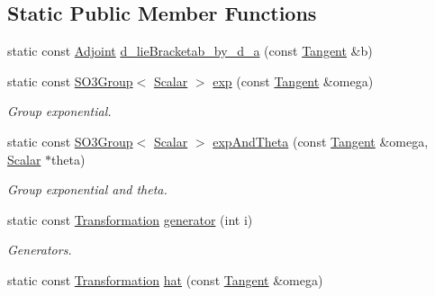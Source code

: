 \subsection*{Static Public Member Functions}
\begin{DoxyCompactItemize}
\item 
static const \hyperlink{class_sophus_1_1_s_o3_group_base_a51c46f75563c21fbd223b4a444923306}{Adjoint} \hyperlink{class_sophus_1_1_s_o3_group_base_a9b89eaf13ca40eb929ce3bc02b71f592}{d\+\_\+lie\+Bracketab\+\_\+by\+\_\+d\+\_\+a} (const \hyperlink{class_sophus_1_1_s_o3_group_base_a11150229b6a471ae96cde974ece5ec7c}{Tangent} \&b)
\item 
static const \hyperlink{class_sophus_1_1_s_o3_group}{S\+O3\+Group}$<$ \hyperlink{class_sophus_1_1_s_o3_group_base_a31bf31815c195b7150da8a8e8c6f0189}{Scalar} $>$ \hyperlink{class_sophus_1_1_s_o3_group_base_a7d224bfb20704608dc41e5a5f16ba9a4}{exp} (const \hyperlink{class_sophus_1_1_s_o3_group_base_a11150229b6a471ae96cde974ece5ec7c}{Tangent} \&omega)
\begin{DoxyCompactList}\small\item\em Group exponential. \end{DoxyCompactList}\item 
static const \hyperlink{class_sophus_1_1_s_o3_group}{S\+O3\+Group}$<$ \hyperlink{class_sophus_1_1_s_o3_group_base_a31bf31815c195b7150da8a8e8c6f0189}{Scalar} $>$ \hyperlink{class_sophus_1_1_s_o3_group_base_a79e8ae77c3461891a8eb2e2b4103c87c}{exp\+And\+Theta} (const \hyperlink{class_sophus_1_1_s_o3_group_base_a11150229b6a471ae96cde974ece5ec7c}{Tangent} \&omega, \hyperlink{class_sophus_1_1_s_o3_group_base_a31bf31815c195b7150da8a8e8c6f0189}{Scalar} $\ast$theta)
\begin{DoxyCompactList}\small\item\em Group exponential and theta. \end{DoxyCompactList}\item 
static const \hyperlink{class_sophus_1_1_s_o3_group_base_aa20fc57bf1b355a6616f5c4b785f1fc5}{Transformation} \hyperlink{class_sophus_1_1_s_o3_group_base_a06c9fd7d013a557fdc92e7983b1f75ac}{generator} (int i)
\begin{DoxyCompactList}\small\item\em Generators. \end{DoxyCompactList}\item 
static const \hyperlink{class_sophus_1_1_s_o3_group_base_aa20fc57bf1b355a6616f5c4b785f1fc5}{Transformation} \hyperlink{class_sophus_1_1_s_o3_group_base_a330c86d19073bb2d142d88078d92a513}{hat} (const \hyperlink{class_sophus_1_1_s_o3_group_base_a11150229b6a471ae96cde974ece5ec7c}{Tangent} \&omega)

\end{DoxyCompactItemize}
